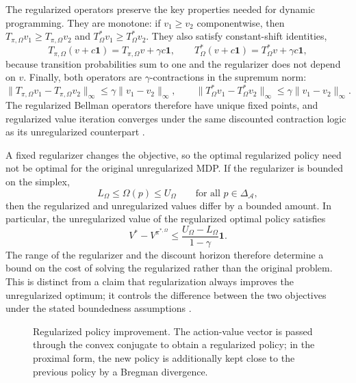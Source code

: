 The regularized operators preserve the key properties needed for dynamic
programming. They are monotone: if $v_1\geq v_2$ componentwise, then
$T_{\pi,\Omega}v_1\geq T_{\pi,\Omega}v_2$ and
$T^*_{\Omega}v_1\geq T^*_{\Omega}v_2$. They also satisfy constant-shift
identities,
\begin{equation}
    T_{\pi,\Omega}(v+c\mathbf{1})
    =T_{\pi,\Omega}v+\gamma c\mathbf{1},
    \qquad
    T^*_{\Omega}(v+c\mathbf{1})
    =T^*_{\Omega}v+\gamma c\mathbf{1},
    \label{eq:rl-regularized-shift}
\end{equation}
because transition probabilities sum to one and the regularizer does not
depend on $v$. Finally, both operators are $\gamma$-contractions in the
supremum norm:
\begin{equation}
    \|T_{\pi,\Omega}v_1-T_{\pi,\Omega}v_2\|_\infty
    \leq\gamma\|v_1-v_2\|_\infty,
    \qquad
    \|T^*_{\Omega}v_1-T^*_{\Omega}v_2\|_\infty
    \leq\gamma\|v_1-v_2\|_\infty.
    \label{eq:rl-regularized-contraction}
\end{equation}
The regularized Bellman operators therefore have unique fixed points, and
regularized value iteration converges under the same discounted contraction
logic as its unregularized counterpart \parencite{geist2019regularized}.

A fixed regularizer changes the objective, so the optimal regularized policy
need not be optimal for the original unregularized MDP. If the regularizer is
bounded on the simplex,
\begin{equation}
    L_\Omega\leq\Omega(p)\leq U_\Omega
    \qquad\text{for all }p\in\Delta_{\mathcal A},
    \label{eq:rl-regularizer-bounds}
\end{equation}
then the regularized and unregularized values differ by a bounded amount.
In particular, the unregularized value of the regularized optimal policy
satisfies
\begin{equation}
    V^* - V^{\pi^{*,\Omega}}
    \leq\frac{U_\Omega-L_\Omega}{1-\gamma}\mathbf{1}.
    \label{eq:rl-regularization-gap}
\end{equation}
The range of the regularizer and the discount horizon therefore determine a
bound on the cost of solving the regularized rather than the original problem.
This is distinct from a claim that regularization always improves the
unregularized optimum; it controls the difference between the two objectives
under the stated boundedness assumptions \parencite{geist2019regularized}.

\begin{figure}[htbp]
    \centering
    \resizebox{\textwidth}{!}{}
    \caption{Regularized policy improvement. The action-value vector is passed
    through the convex conjugate to obtain a regularized policy; in the
    proximal form, the new policy is additionally kept close to the previous
    policy by a Bregman divergence.}
    \label{fig:rl-regularized-mdp}
\end{figure}

